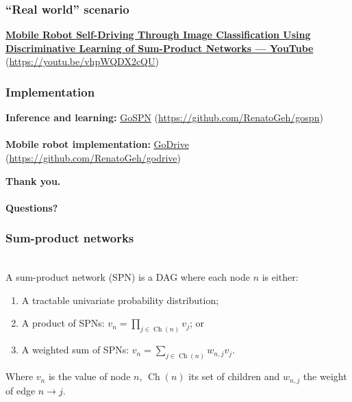 \documentclass{beamer}
\DeclareMathOperator*{\Ch}{\text{Ch}}
\begin{document}
\begin{frame}
  \frametitle{``Real world'' scenario}

  \footnotesize\centering\textbf{\href{https://youtu.be/vhpWQDX2cQU}{Mobile Robot Self-Driving Through Image Classification Using
  Discriminative Learning of Sum-Product Networks --- YouTube}}
  (\url{https://youtu.be/vhpWQDX2cQU})
\end{frame}

\begin{frame}
  \frametitle{Implementation}
  \centering
  \large\textbf{Inference and learning:} \href{https://github.com/RenatoGeh/gospn}{GoSPN}
  (\url{https://github.com/RenatoGeh/gospn})\\~\\

  \textbf{Mobile robot implementation:} \href{https://github.com/RenatoGeh/godrive}{GoDrive}
  (\url{https://github.com/RenatoGeh/godrive})

\end{frame}

\begin{frame}
  \begin{center}
    \textbf{Thank you.\\~\\Questions?}
  \end{center}
\end{frame}

\begin{frame}
  \frametitle{Sum-product networks}

  \begin{definition}~\\
    A sum-product network (SPN) is a DAG where each node $n$ is either:
    \begin{enumerate}
      \item A tractable univariate probability distribution;
      \item A product of SPNs: $v_n=\prod_{j\in\Ch(n)}v_j$; or
      \item A weighted sum of SPNs: $v_n=\sum_{j\in\Ch(n)}w_{n,j}v_j$.
    \end{enumerate}
    Where $v_n$ is the value of node $n$, $\Ch(n)$ its set of children and $w_{n,j}$ the weight of
    edge $n\to j$.
  \end{definition}
\end{frame}
\end{document}
